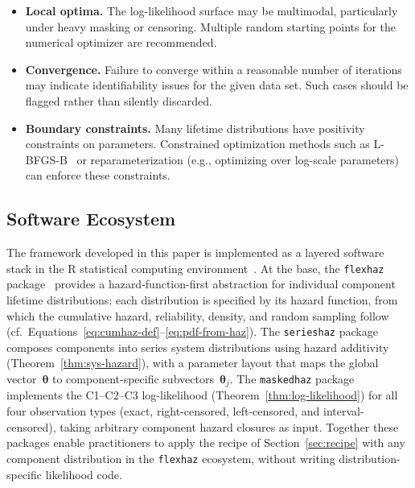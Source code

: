 \documentclass[11pt]{article}
\theoremstyle{definition}
\theoremstyle{plain}
\renewcommand{\v}[1]{\boldsymbol{#1}}
\newcommand{\btheta}{\v{\theta}}
\begin{document}
\begin{itemize}
    \item \textbf{Local optima.}
    The log-likelihood surface may be multimodal, particularly under
    heavy masking or censoring.
    Multiple random starting points for the numerical optimizer are
    recommended.

    \item \textbf{Convergence.}
    Failure to converge within a reasonable number of iterations may
    indicate identifiability issues for the given data set.
    Such cases should be flagged rather than silently discarded.

    \item \textbf{Boundary constraints.}
    Many lifetime distributions have positivity constraints on parameters.
    Constrained optimization methods such as L-BFGS-B~\citep{byrd1995}
    or reparameterization (e.g., optimizing over log-scale parameters)
    can enforce these constraints.
\end{itemize}

\subsection{Software Ecosystem}
\label{sec:software}

The framework developed in this paper is implemented as a layered
software stack in the R statistical computing
environment~\citep{towell2025flexhaz,towell2025serieshaz,towell2025maskedhaz}.
At the base, the \texttt{flexhaz}
package~\citep{towell2025flexhaz} provides a hazard-function-first
abstraction for individual component lifetime distributions: each
distribution is specified by its hazard function, from which the
cumulative hazard, reliability, density, and random sampling follow
(cf.\ Equations~\eqref{eq:cumhaz-def}--\eqref{eq:pdf-from-haz}).
The \texttt{serieshaz} package~\citep{towell2025serieshaz}
composes components into series system distributions using hazard
additivity (Theorem~\ref{thm:sys-hazard}), with a parameter layout
that maps the global vector~$\btheta$ to component-specific
subvectors~$\v{\theta}_j$.
The \texttt{maskedhaz}
package~\citep{towell2025maskedhaz} implements the C1--C2--C3
log-likelihood (Theorem~\ref{thm:log-likelihood}) for all four
observation types (exact, right-censored, left-censored, and
interval-censored), taking arbitrary component hazard closures as
input.
Together these packages enable practitioners to apply the recipe of
Section~\ref{sec:recipe} with any component distribution in the
\texttt{flexhaz} ecosystem, without writing distribution-specific
likelihood code.
\end{document}
